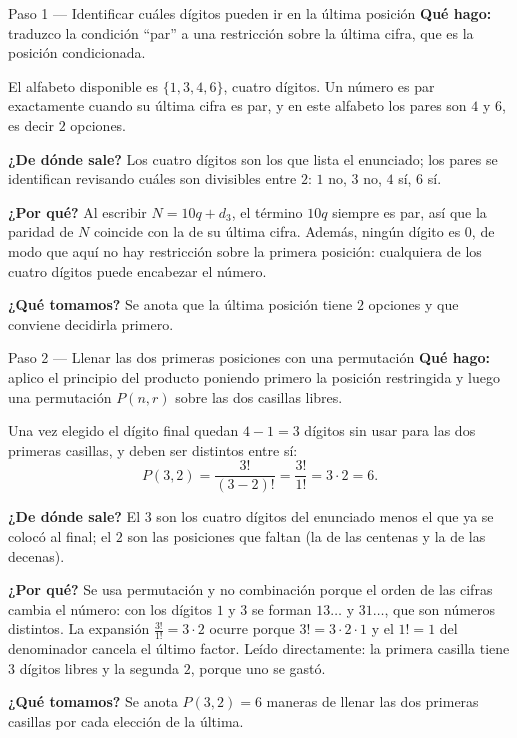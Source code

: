 \documentclass[11pt]{article}
\begin{document}
\begin{paso}{Paso 1 --- Identificar cuáles dígitos pueden ir en la última posición}
\textbf{Qué hago:} traduzco la condición ``par'' a una restricción sobre la última cifra, que es la posición condicionada.

El alfabeto disponible es $\{1,3,4,6\}$, cuatro dígitos. Un número es par exactamente cuando su última cifra es par, y en este alfabeto los pares son $4$ y $6$, es decir $2$ opciones.

\textbf{¿De dónde sale?} Los cuatro dígitos son los que lista el enunciado; los pares se identifican revisando cuáles son divisibles entre $2$: $1$ no, $3$ no, $4$ sí, $6$ sí.

\textbf{¿Por qué?} Al escribir $N=10q+d_3$, el término $10q$ siempre es par, así que la paridad de $N$ coincide con la de su última cifra. Además, ningún dígito es $0$, de modo que aquí no hay restricción sobre la primera posición: cualquiera de los cuatro dígitos puede encabezar el número.

\textbf{¿Qué tomamos?} Se anota que la última posición tiene $2$ opciones y que conviene decidirla primero.
\end{paso}

\begin{paso}{Paso 2 --- Llenar las dos primeras posiciones con una permutación}
\textbf{Qué hago:} aplico el principio del producto poniendo primero la posición restringida y luego una permutación $P(n,r)$ sobre las dos casillas libres.

Una vez elegido el dígito final quedan $4-1=3$ dígitos sin usar para las dos primeras casillas, y deben ser distintos entre sí:
\[
  P(3,2)=\frac{3!}{(3-2)!}=\frac{3!}{1!}=3\cdot 2 = 6 .
\]

\textbf{¿De dónde sale?} El $3$ son los cuatro dígitos del enunciado menos el que ya se colocó al final; el $2$ son las posiciones que faltan (la de las centenas y la de las decenas).

\textbf{¿Por qué?} Se usa permutación y no combinación porque el orden de las cifras cambia el número: con los dígitos $1$ y $3$ se forman $13\ldots$ y $31\ldots$, que son números distintos. La expansión $\frac{3!}{1!}=3\cdot 2$ ocurre porque $3!=3\cdot 2\cdot 1$ y el $1!=1$ del denominador cancela el último factor. Leído directamente: la primera casilla tiene $3$ dígitos libres y la segunda $2$, porque uno se gastó.

\textbf{¿Qué tomamos?} Se anota $P(3,2)=6$ maneras de llenar las dos primeras casillas por cada elección de la última.
\end{paso}
\end{document}
